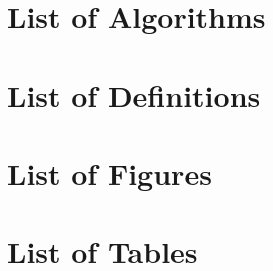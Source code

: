 \section*{List of Algorithms}
\renewcommand{\listofalgorithms}{\begingroup
  \tocfile{List of Algorithms}{loa}
  \endgroup}
\makeatletter
\let\l@algorithm\l@figure
\makeatother
\makeatletter
{}
\makeatother

\section*{List of Definitions}
\listofthmlike[ignoreall,show={definition}]

\section*{List of Figures}
\makeatletter
{}
\makeatother

\section*{List of Tables}
\makeatletter
{}
\makeatother
